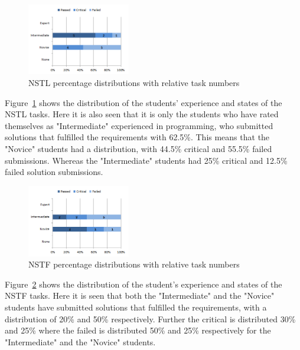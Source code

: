 \documentclass{sig-alternate-05-2015}
\begin{document}
\begin{figure}[H]
	\centering
	\includegraphics[width=0.4\textwidth]{img08}
	\caption{NSTL percentage distributions with relative task numbers}
	\label{fig:NSTL percentage distributions with relative task numbers}
\end{figure}

Figure~\ref{fig:NSTL percentage distributions with relative task numbers} shows the distribution of the students' experience and states of the NSTL tasks. Here it is also seen that it is only the students who have rated themselves as "Intermediate" experienced in programming, who submitted solutions that fulfilled the requirements with 62.5\%. This means that the "Novice" students had a distribution, with 44.5\% critical and 55.5\% failed submissions. Whereas the "Intermediate" students had 25\% critical and 12.5\% failed solution submissions.

\begin{figure}[H]
	\centering
	\includegraphics[width=0.4\textwidth]{img09}
	\caption{NSTF percentage distributions with relative task numbers}
	\label{fig:NSTF percentage distributions with relative task numbers}
\end{figure}

Figure~\ref{fig:NSTF percentage distributions with relative task numbers} shows the distribution of the student's experience and states of the NSTF tasks. Here it is seen that both the "Intermediate" and the "Novice" students have submitted solutions that fulfilled the requirements, with a distribution of 20\% and 50\% respectively. Further the critical is distributed 30\% and 25\% where the failed is distributed 50\% and 25\% respectively for the "Intermediate" and the "Novice" students.
\end{document}
